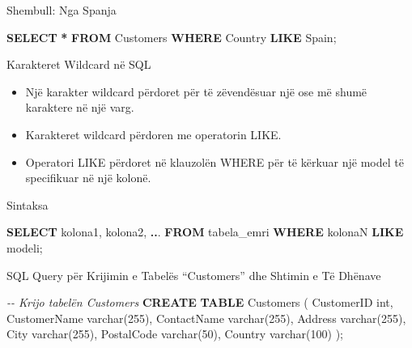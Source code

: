 \documentclass[
  ignorenonframetext,
]{beamer}
\newenvironment{Shaded}{\begin{snugshade}}{\end{snugshade}}
\newcommand{\CommentTok}[1]{\textcolor[rgb]{0.56,0.35,0.01}{\textit{#1}}}
\newcommand{\DataTypeTok}[1]{\textcolor[rgb]{0.13,0.29,0.53}{#1}}
\newcommand{\DecValTok}[1]{\textcolor[rgb]{0.00,0.00,0.81}{#1}}
\newcommand{\KeywordTok}[1]{\textcolor[rgb]{0.13,0.29,0.53}{\textbf{#1}}}
\newcommand{\NormalTok}[1]{#1}
\newcommand{\OperatorTok}[1]{\textcolor[rgb]{0.81,0.36,0.00}{\textbf{#1}}}
\newcommand{\StringTok}[1]{\textcolor[rgb]{0.31,0.60,0.02}{#1}}
\begin{document}
\begin{frame}[fragile]{Shembull: Nga Spanja}
\label{shembull-nga-spanja}
\begin{Shaded}
\begin{Highlighting}[]
\KeywordTok{SELECT} \OperatorTok{*}
\KeywordTok{FROM}\NormalTok{ Customers}
\KeywordTok{WHERE}\NormalTok{ Country }\KeywordTok{LIKE} \StringTok{\textquotesingle{}Spain\textquotesingle{}}\NormalTok{;}
\end{Highlighting}
\end{Shaded}
\end{frame}

\begin{frame}{Karakteret Wildcard në SQL}
\label{karakteret-wildcard-nuxeb-sql}
\begin{itemize}
\item
  Një karakter wildcard përdoret për të zëvendësuar një ose më shumë
  karaktere në një varg.
\item
  Karakteret wildcard përdoren me operatorin LIKE.
\item
  Operatori LIKE përdoret në klauzolën WHERE për të kërkuar një model të
  specifikuar në një kolonë.
\end{itemize}
\end{frame}

\begin{frame}[fragile]{Sintaksa}
\label{sintaksa}
\begin{Shaded}
\begin{Highlighting}[]
\KeywordTok{SELECT}\NormalTok{ kolona1, kolona2, }\OperatorTok{..}\NormalTok{.}
\KeywordTok{FROM}\NormalTok{ tabela\_emri}
\KeywordTok{WHERE}\NormalTok{ kolonaN }\KeywordTok{LIKE}\NormalTok{ modeli;}
\end{Highlighting}
\end{Shaded}
\end{frame}

\begin{frame}[fragile]{SQL Query për Krijimin e Tabelës ``Customers''
dhe Shtimin e Të Dhënave}
\label{sql-query-puxebr-krijimin-e-tabeluxebs-customers-dhe-shtimin-e-tuxeb-dhuxebnave}

\begin{Shaded}
\begin{Highlighting}[]
\CommentTok{{-}{-} Krijo tabelën Customers}
\KeywordTok{CREATE} \KeywordTok{TABLE}\NormalTok{ Customers (}
\NormalTok{    CustomerID }\DataTypeTok{int}\NormalTok{,}
\NormalTok{    CustomerName }\DataTypeTok{varchar}\NormalTok{(}\DecValTok{255}\NormalTok{),}
\NormalTok{    ContactName }\DataTypeTok{varchar}\NormalTok{(}\DecValTok{255}\NormalTok{),}
\NormalTok{    Address }\DataTypeTok{varchar}\NormalTok{(}\DecValTok{255}\NormalTok{),}
\NormalTok{    City }\DataTypeTok{varchar}\NormalTok{(}\DecValTok{255}\NormalTok{),}
\NormalTok{    PostalCode }\DataTypeTok{varchar}\NormalTok{(}\DecValTok{50}\NormalTok{),}
\NormalTok{    Country }\DataTypeTok{varchar}\NormalTok{(}\DecValTok{100}\NormalTok{)}
\NormalTok{);}
\end{Highlighting}
\end{Shaded}
\end{frame}
\end{document}
